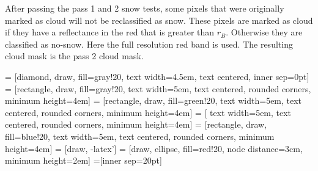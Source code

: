 \documentclass[a4paper]{article}
\begin{document}
After passing the pass 1 and 2 snow tests, some pixels that were originally marked as cloud will not be reclassified as snow. These pixels are marked as cloud if they have a reflectance in the red that is greater than $r_B$. Otherwise they are classified as no-snow. Here the full resolution red band is used. The resulting cloud mask is the pass 2 cloud mask. 

\pagestyle{empty}

 = [diamond, draw, fill=gray!20, 
    text width=4.5em, text centered, inner sep=0pt]
 = [rectangle, draw, fill=gray!20, 
    text width=5em, text centered, rounded corners, minimum height=4em]
 = [rectangle, draw, fill=green!20, 
    text width=5em, text centered, rounded corners, minimum height=4em]
 = [ 
    text width=5em, text centered, rounded corners, minimum height=4em]
 = [rectangle, draw, fill=blue!20, 
    text width=5em, text centered, rounded corners, minimum height=4em]
 = [draw, -latex']
 = [draw, ellipse, fill=red!20, node distance=3cm,
    minimum height=2em]
=[inner sep=20pt]
\end{document}
